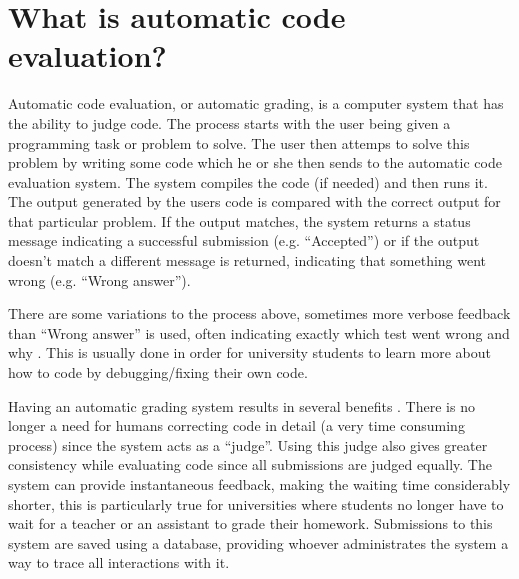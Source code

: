 \section{What is automatic code evaluation?}
Automatic code evaluation, or automatic grading, is a computer system that has the ability to judge code. The process starts with the user being given a programming task or problem to solve. The user then attemps to solve this problem by writing some code which he or she then sends to the automatic code evaluation system. The system compiles the code (if needed) and then runs it. The output generated by the users code is compared with the correct output for that particular problem. If the output matches, the system returns a status message indicating a successful submission (e.g. ``Accepted'') or if the output doesn't match a different message is returned, indicating that something went wrong (e.g. ``Wrong answer''). 

There are some variations to the process above, sometimes more verbose feedback than ``Wrong answer'' is used, often indicating exactly which test went wrong and why \cite{Gradebot}. This is usually done in order for university students to learn more about how to code by debugging/fixing their own code.

Having an automatic grading system results in several benefits \cite{Suleman}. There is no longer a need for humans correcting code in detail (a very time consuming process) since the system acts as a ``judge''. Using this judge also gives greater consistency while evaluating code since all submissions are judged equally. The system can provide instantaneous feedback, making the waiting time considerably shorter, this is particularly true for universities where students no longer have to wait for a teacher or an assistant to grade their homework. Submissions to this system are saved using a database, providing whoever administrates the system a way to trace all interactions with it.
